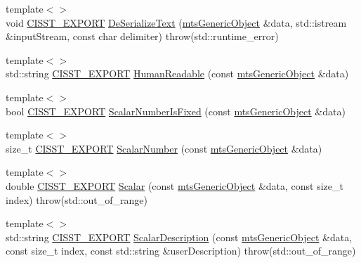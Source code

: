 \begin{DoxyCompactItemize}
\item 
{\footnotesize template$<$$>$ }\\void \hyperlink{cmn_export_macros_8h_a99393e0c3ac434b2605235bbe20684f8}{C\-I\-S\-S\-T\-\_\-\-E\-X\-P\-O\-R\-T} \hyperlink{classcmn_data_a8965ee72ee62e9cf1d666813d764b3ca}{De\-Serialize\-Text} (\hyperlink{classmts_generic_object}{mts\-Generic\-Object} \&data, std\-::istream \&input\-Stream, const char delimiter) throw(std\-::runtime\-\_\-error)
\item 
{\footnotesize template$<$$>$ }\\std\-::string \hyperlink{cmn_export_macros_8h_a99393e0c3ac434b2605235bbe20684f8}{C\-I\-S\-S\-T\-\_\-\-E\-X\-P\-O\-R\-T} \hyperlink{classcmn_data_ad0968cc16b9423331cdb949101ab4bed}{Human\-Readable} (const \hyperlink{classmts_generic_object}{mts\-Generic\-Object} \&data)
\item 
{\footnotesize template$<$$>$ }\\bool \hyperlink{cmn_export_macros_8h_a99393e0c3ac434b2605235bbe20684f8}{C\-I\-S\-S\-T\-\_\-\-E\-X\-P\-O\-R\-T} \hyperlink{classcmn_data_a458e5d0b1d6a2e9c126622865707d703}{Scalar\-Number\-Is\-Fixed} (const \hyperlink{classmts_generic_object}{mts\-Generic\-Object} \&data)
\item 
{\footnotesize template$<$$>$ }\\size\-\_\-t \hyperlink{cmn_export_macros_8h_a99393e0c3ac434b2605235bbe20684f8}{C\-I\-S\-S\-T\-\_\-\-E\-X\-P\-O\-R\-T} \hyperlink{classcmn_data_a4120c9b93519d00e31b3e82e57276c20}{Scalar\-Number} (const \hyperlink{classmts_generic_object}{mts\-Generic\-Object} \&data)
\item 
{\footnotesize template$<$$>$ }\\double \hyperlink{cmn_export_macros_8h_a99393e0c3ac434b2605235bbe20684f8}{C\-I\-S\-S\-T\-\_\-\-E\-X\-P\-O\-R\-T} \hyperlink{classcmn_data_a270de4f6202877444776d8d60c738319}{Scalar} (const \hyperlink{classmts_generic_object}{mts\-Generic\-Object} \&data, const size\-\_\-t index) throw(std\-::out\-\_\-of\-\_\-range)
\item 
{\footnotesize template$<$$>$ }\\std\-::string \hyperlink{cmn_export_macros_8h_a99393e0c3ac434b2605235bbe20684f8}{C\-I\-S\-S\-T\-\_\-\-E\-X\-P\-O\-R\-T} \hyperlink{classcmn_data_ae6c4c0e4076051b08cb2102885208ba6}{Scalar\-Description} (const \hyperlink{classmts_generic_object}{mts\-Generic\-Object} \&data, const size\-\_\-t index, const std\-::string \&user\-Description) throw(std\-::out\-\_\-of\-\_\-range)
\end{DoxyCompactItemize}
